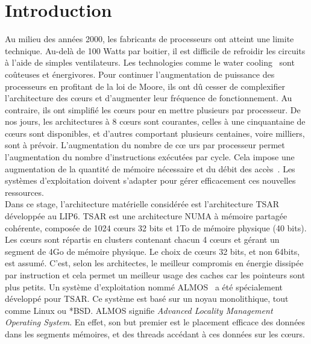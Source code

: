 \chapter{Introduction}

  Au milieu des années 2000, les fabricants de processeurs ont atteint une
  limite technique.  Au-delà de 100 Watts par boitier, il est difficile de
  refroidir les circuits à l'aide de simples ventilateurs. Les technologies
  comme le water cooling~\citep{googleXXXXdatacenters} sont coûteuses et
  énergivores.  Pour continuer l'augmentation de puissance des processeurs en
  profitant de la loi de Moore, ils ont dû cesser de complexifier l'architecture
  des c\oe urs et d'augmenter leur fréquence de fonctionnement. Au contraire,
  ils ont simplifié les c\oe urs pour en mettre plusieurs par processeur.  De
  nos jours, les architectures à 8 c\oe urs sont courantes, celles à une
  cinquantaine de c\oe urs sont disponibles, et d'autres comportant plusieurs
  centaines, voire milliers, sont à prévoir.  L'augmentation du nombre de c\oe
  urs par processeur permet l'augmentation du nombre d'instructions exécutées
  par cycle.  Cela impose une augmentation de la quantité de mémoire nécessaire
  et du débit des accès~\citep{hp2012z820, puget2013z9pe}. Les systèmes
  d'exploitation doivent s'adapter pour gérer efficacement ces nouvelles
  ressources.\\

  Dans ce stage, l'architecture matérielle considérée est l'architecture
  TSAR~\citep{greiner2009tsar}
  développée au LIP6. TSAR est une architecture NUMA à mémoire partagée cohérente, composée de 1024 c\oe urs 32 bits et
  1To de mémoire physique (40 bits).  Les c\oe urs sont répartis en clusters
  contenant chacun 4 c\oe urs et gérant un segment de 4Go de mémoire
  physique. Le choix de c\oe urs 32 bits, et non 64bits, est assumé. C'est,
  selon les architectes, le meilleur compromis en énergie dissipée par
  instruction et cela permet un meilleur usage des caches car les pointeurs sont
  plus petits.  Un système d'exploitation nommé
  ALMOS~\citep{almaless2011almos} a été spécialement développé pour TSAR. Ce
  système est basé sur un noyau monolithique, tout comme Linux ou
  *BSD. ALMOS signifie
  \textit{Advanced Locality Management Operating System}. En effet, son but
  premier est le placement efficace des données dans les segments mémoires, et
  des threads accédant à ces données sur les c\oe urs.\\

